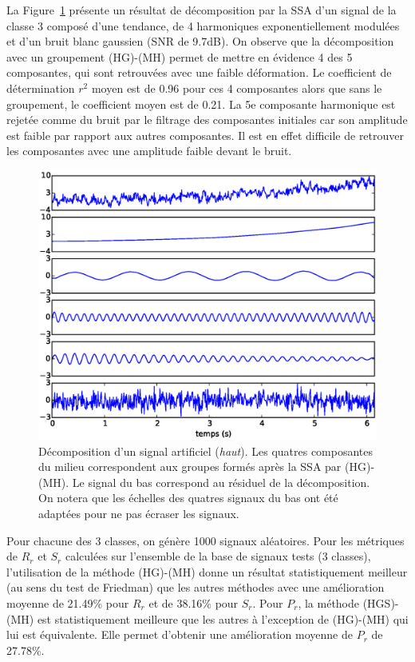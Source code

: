 \documentclass{gretsi}
\begin{document}
La Figure~\ref{fig:dec} présente un résultat de décomposition par la SSA d'un signal de la classe 3 composé d'une tendance, de 4 harmoniques exponentiellement modulées et d'un bruit blanc gaussien (SNR de 9.7dB).
On observe que la décomposition  avec un groupement (HG)-(MH) permet de mettre en évidence 4 des 5 composantes, qui sont retrouvées avec une faible déformation. 
Le coefficient de détermination $r^2$ moyen est de 0.96 pour ces 4 composantes alors que sans le groupement, le coefficient moyen est de 0.21.
La 5e composante harmonique est rejetée comme du bruit par le filtrage des composantes initiales car son amplitude est faible par rapport aux autres composantes.
Il est en effet difficile de retrouver les composantes avec une amplitude faible devant le bruit.


    \begin{figure}[tp]
        \centering
        \includegraphics[width=.5\textwidth]{img/artsig3.eps}
        \caption{Décomposition d'un signal artificiel (\emph{haut}). Les quatres composantes du milieu correspondent aux groupes formés après la SSA par (HG)-(MH). Le signal du bas correspond au résiduel de la décomposition. On notera que les échelles des quatres signaux du bas ont été adaptées pour ne pas écraser les signaux.} %
        \label{fig:dec}
    \end{figure}

Pour chacune des 3 classes, on génère 1000 signaux aléatoires.
Pour les métriques de $R_r$ et $S_r$ calculées sur l'ensemble de la base de signaux tests (3 classes), l'utilisation de la méthode (HG)-(MH) donne un résultat statistiquement meilleur (au sens du test de Friedman) que les autres méthodes avec une amélioration moyenne de 21.49\% pour $R_r$ et de 38.16\% pour $S_r$.
Pour $P_r$, la méthode (HGS)-(MH) est statistiquement meilleure que les autres à l'exception de (HG)-(MH) qui lui est équivalente.
Elle permet d'obtenir une amélioration moyenne de $P_r$ de 27.78\%.
\end{document}
